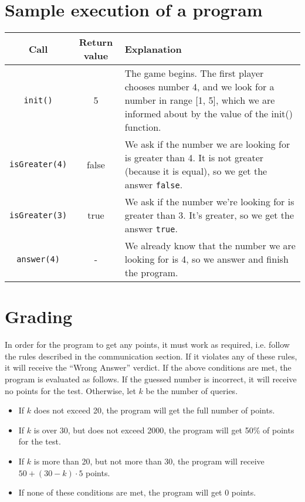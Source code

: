 \documentclass{spiral}
\begin{document}
\section{Sample execution of a program}

    \begin{tabular}{|c|c|p{12.5cm}|}
        \hline

        \textbf{Call} & \textbf{Return value} & \textbf{Explanation} \\ \hline

        \texttt{init()} & 5 &
        The game begins. The first player chooses number 4,
        and we look for a number in range [1, 5],
        which we are informed about by the value of the init() function.
        \\ \hline

        \texttt{isGreater(4)} & false &
        We ask if the number we are looking for is greater than 4.
        It is not greater (because it is equal),
        so we get the answer \texttt{false}.  
        \\ \hline

        \texttt{isGreater(3)} & true &
        We ask if the number we're looking for is greater than 3.
        It's greater, so we get the answer \texttt{true}.  
        \\ \hline

        \texttt{answer(4)} & - &
        We already know that the number we are looking for is 4,
        so we answer and finish the program.
        \\ \hline
    \end{tabular}



    \section{Grading}

    In order for the program to get any points, it must work as required,
    i.e. follow the rules described in the communication section.
    If it violates any of these rules, it will receive the ``Wrong Answer'' verdict.
    If the above conditions are met, the program is evaluated as follows.
    If the guessed number is incorrect, it will receive no points for the test.
    Otherwise, let $k$ be the number of queries.
    \begin{itemize}
        \item If $k$ does not exceed 20, the program will get
            the full number of points.
        \item If $k$ is over 30, but does not exceed 2000, the program will get
            50\% of points for the test.
        \item If $k$ is more than 20, but not more than 30,
            the program will receive $50 + (30 - k) \cdot 5$ points.
        \item If none of these conditions are met, the program will get 0 points.
    \end{itemize}
\end{document}
